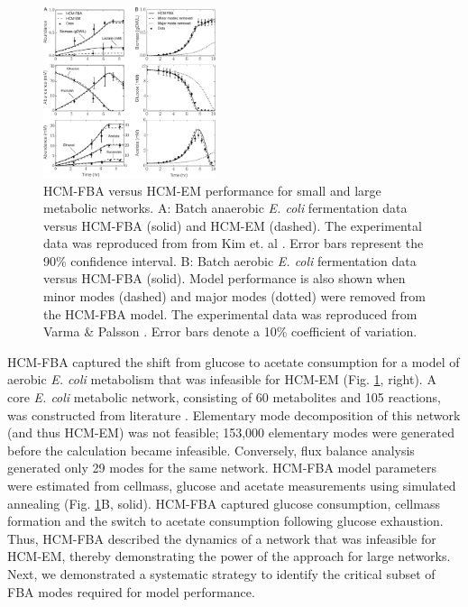 \documentclass[10pt,twocolumn,twoside,final]{IEEEtran}
\begin{document}
\begin{figure}[!t]\centering
\includegraphics[width=0.45\textwidth]{./figs/Fig-2-Ecoli-SimulationResults.pdf}
\caption{HCM-FBA versus HCM-EM performance for small and large metabolic networks.
A: Batch anaerobic \textit{E. coli} fermentation data versus HCM-FBA (solid) and HCM-EM (dashed).
The experimental data was reproduced from from Kim et. al \cite{2008_kim_varner_ramkrishna_BiotechProg}. Error bars represent the 90\% confidence interval.
B: Batch aerobic \textit{E. coli} fermentation data versus HCM-FBA (solid).
Model performance is also shown when minor modes (dashed) and major modes (dotted) were removed from the HCM-FBA model.
The experimental data was reproduced from Varma \& Palsson \cite{1994_varma_palsson_ApplEnvMicro}. Error bars denote a 10\% coefficient of variation.}
\label{fig:ecoli}
\end{figure}

HCM-FBA captured the shift from glucose to acetate consumption for a model of aerobic \textit{E. coli} metabolism that was infeasible for HCM-EM (Fig. \ref{fig:ecoli}, right).
A core \emph{E. coli} metabolic network, consisting of 60 metabolites and 105 reactions, was constructed from literature \cite{2007_schuetz_etal_MolSysBio,2006_Palsson_model}.
Elementary mode decomposition of this network (and thus HCM-EM) was not feasible; 153,000 elementary modes were generated before the calculation became infeasible.
Conversely, flux balance analysis generated only 29 modes for the same network.
HCM-FBA model parameters were estimated from cellmass, glucose and acetate measurements \cite{1994_varma_palsson_ApplEnvMicro} using simulated annealing (Fig. \ref{fig:ecoli}B, solid).
HCM-FBA captured glucose consumption, cellmass formation and the switch to acetate consumption following glucose exhaustion.
Thus, HCM-FBA described the dynamics of a network that was infeasible for HCM-EM, thereby demonstrating the power of the approach for large networks.
Next, we demonstrated a systematic strategy to identify the critical subset of FBA modes required for model performance.
\end{document}
